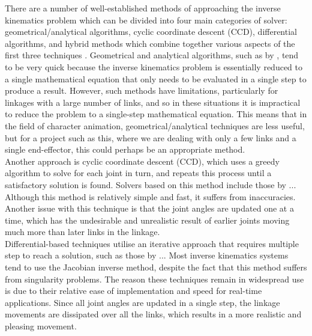 \documentclass[paper=a4, fontsize=11pt]{scrartcl} %
\numberwithin{equation}{section} %
\numberwithin{figure}{section} %
\numberwithin{table}{section} %
\begin{document}
There are a number of well-established methods of approaching the inverse kinematics problem which can be divided into four main categories of solver: geometrical/analytical algorithms, cyclic coordinate descent (CCD), differential algorithms, and hybrid methods which combine together various aspects of the first three techniques \cite{Madd04}. Geometrical and analytical algorithms, such as by \cite{Kwan00}, \cite{Chin96} tend to be very quick because the inverse kinematics problem is essentially reduced to a single mathematical equation that only needs to be evaluated in a single step to produce a result. However, such methods have limitations, particularly for linkages with a large number of links, and so in these situations it is impractical to reduce the problem to a single-step mathematical equation. This means that in the field of character animation, geometrical/analytical techniques are less useful, but for a project such as this, where we are dealing with only a few links and a single end-effector, this could perhaps be an appropriate method. \\

Another approach is cyclic coordinate descent (CCD), which uses a greedy algorithm to solve for each joint in turn, and repeats this process until a satisfactory solution is found. Solvers based on this method include those by ... Although this method is relatively simple and fast, it suffers from inaccuracies. Another issue with this technique is that the joint angles are updated one at a time, which has the undesirable and unrealistic result of earlier joints moving much more than later links in the linkage. \\

Differential-based techniques utilise an iterative approach that requires multiple step to reach a solution, such as those by ... Most inverse kinematics systems tend to use the Jacobian inverse method, despite the fact that this method suffers from singularity problems. The reason these techniques remain in widespread use is due to their relative ease of implementation and speed for real-time applications. Since all joint angles are updated in a single step, the linkage movements are dissipated over all the links, which results in a more realistic and pleasing movement. 



\end{document}
